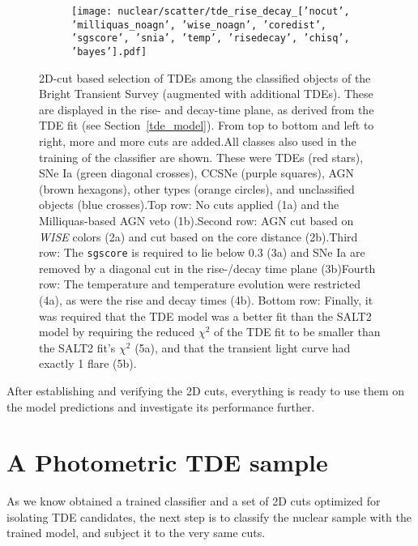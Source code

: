 \begin{figure}[htbp]
\begin{subfigure}[b]{0.49\textwidth}
  \end{subfigure}
  \begin{subfigure}[b]{0.49\textwidth}
    \centering
    \texttt{[image: nuclear/scatter/tde\_rise\_decay\_['nocut', 'milliquas\_noagn', 'wise\_noagn', 'coredist', 'sgscore', 'snia', 'temp', 'risedecay', 'chisq', 'bayes'].pdf]}
  \end{subfigure}
  \caption[BTS selection]{2D-cut based selection of TDEs among the classified objects of the Bright Transient Survey (augmented with additional TDEs). These are displayed in the rise- and decay-time plane, as derived from the TDE fit (see Section~\ref{tde_model}). From top to bottom and left to right, more and more cuts are added.\newline \newline All classes also used in the training of the classifier are shown. These were TDEs (red stars), SNe Ia (green diagonal crosses), CCSNe (purple squares), AGN (brown hexagons), other types (orange circles), and unclassified objects (blue crosses).\newline \newline Top row: No cuts applied (1a) and the Milliquas-based AGN veto (1b).\newline \newline Second row: AGN cut based on \textit{WISE} colors (2a) and cut based on the core distance (2b).\newline \newline Third row: The \texttt{sgscore} is required to lie below 0.3 (3a) and SNe Ia are removed by a diagonal cut in the rise-/decay time plane (3b)\newline \newline Fourth row: The temperature and temperature evolution were restricted (4a), as were the rise and decay times (4b). \newline \newline Bottom row: Finally, it was required that the TDE model was a better fit than the SALT2 model by requiring the reduced $\chi^2$ of the TDE fit to be smaller than the SALT2 fit's $\chi^2$ (5a), and that the transient light curve had exactly 1 flare (5b).}
\end{figure}

After establishing and verifying the 2D cuts, everything is ready to use them on the model predictions and investigate its performance further.

\section{A Photometric TDE sample}
As we know obtained a trained classifier and a set of 2D cuts optimized for isolating TDE candidates, the next step is to classify the nuclear sample with the trained model, and subject it to the very same cuts.

